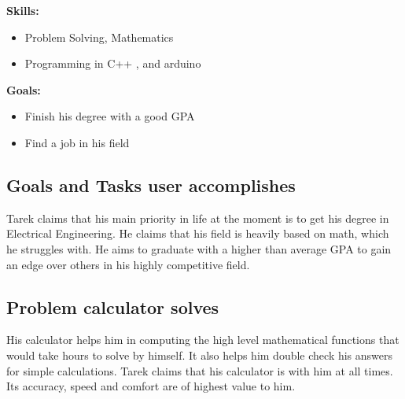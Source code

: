\documentclass{article}
\begin{document}
\textbf{Skills:}
\begin{itemize}
\itemsep0em 
\item Problem Solving, Mathematics
\item Programming in C++ , and arduino 
\end{itemize}

\textbf{Goals:}
\begin{itemize}
\itemsep0em 
\item Finish his degree with a good GPA
\item Find a job in his field
\end{itemize}

\subsection*{Goals and Tasks user accomplishes}
Tarek claims that his main priority in life at the moment is to get his degree in Electrical Engineering. He claims that his field is heavily based on math, which he struggles with.
He aims to graduate with a higher than average GPA to gain an edge over others in his highly competitive field.

\subsection*{Problem calculator solves}
His calculator helps him in computing the high level mathematical functions that would take hours to solve by himself. It also helps him double check his answers for simple calculations.
Tarek claims that his calculator is with him at all times. Its accuracy, speed and comfort are of highest value to him.

\pagebreak
\end{document}
